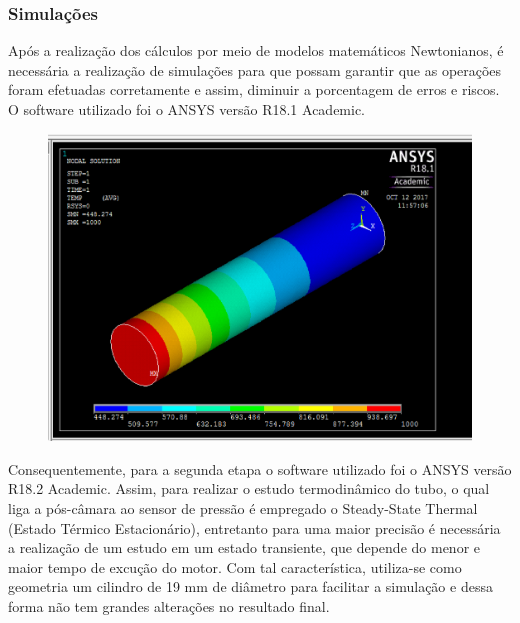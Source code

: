 \subsubsection{Simulações}
Após a realização dos cálculos por meio de modelos matemáticos Newtonianos, é necessária a realização de simulações para que possam garantir que as operações foram efetuadas corretamente e assim, diminuir a porcentagem de erros e riscos. O software utilizado foi o ANSYS versão R18.1 Academic.

\begin{figure}[!htb]                                                               
   \centering                                                                      
   \includegraphics[scale=0.5, keepaspectratio=true]{figuras/Resultado1.eps}                      
\end{figure}

Consequentemente, para a segunda etapa o software utilizado foi o ANSYS versão R18.2 Academic. Assim, para realizar o estudo termodinâmico do tubo, o qual liga a pós-câmara ao sensor de pressão é empregado o Steady-State Thermal (Estado Térmico Estacionário), entretanto para uma maior precisão é necessária a realização de um estudo em um estado transiente, que depende do menor e maior tempo de excução do motor. Com tal característica, utiliza-se como geometria um cilindro de 19 mm de diâmetro para facilitar a simulação e dessa forma não tem grandes alterações no resultado final.

\newpage

